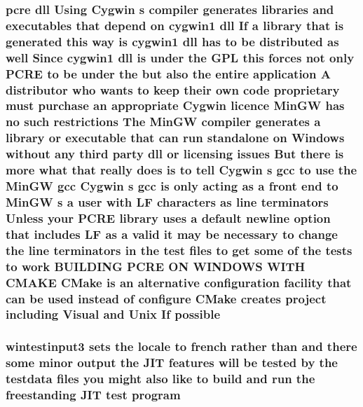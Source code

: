 \subsubsection[{\texorpdfstring{possible}{possible}}]{ {\bf pcre} dll Using Cygwin {\bf s} {\bf compiler} generates {\bf libraries} and executables that depend {\bf on} cygwin1 dll If {\bf a} {\bf library} that {\bf is} {\bf generated} {\bf this} {\bf way} {\bf is} cygwin1 dll has {\bf to} {\bf be} {\bf distributed} {\bf as} well Since cygwin1 dll {\bf is} under the {\bf G\+PL} {\bf this} forces {\bf not} only {\bf P\+C\+RE} {\bf to} {\bf be} under the but also the entire application {\bf A} distributor who wants {\bf to} keep their own {\bf code} proprietary must purchase an appropriate Cygwin {\bf licence} {\bf Min\+GW} has no such restrictions The {\bf Min\+GW} {\bf compiler} generates {\bf a} {\bf library} {\bf or} executable that {\bf can} {\bf run} standalone {\bf on} {\bf Windows} without {\bf any} third party dll {\bf or} licensing issues But there {\bf is} more {\bf what} that really does {\bf is} {\bf to} tell Cygwin {\bf s} {\bf gcc} {\bf to} use the {\bf Min\+GW} {\bf gcc} Cygwin {\bf s} {\bf gcc} {\bf is} only acting {\bf as} {\bf a} front {\bf end} {\bf to} {\bf Min\+GW} {\bf s} {\bf a} user {\bf with} {\bf LF} {\bf characters} {\bf as} {\bf line} terminators Unless your {\bf P\+C\+RE} {\bf library} uses {\bf a} {\bf default} {\bf newline} {\bf option} that includes {\bf LF} {\bf as} {\bf a} valid {\bf it} may {\bf be} necessary {\bf to} change the {\bf line} terminators {\bf in} the test {\bf files} {\bf to} get some {\bf of} the {\bf tests} {\bf to} work B\+U\+I\+L\+D\+I\+NG {\bf P\+C\+RE} ON W\+I\+N\+D\+O\+WS W\+I\+TH C\+M\+A\+KE C\+Make {\bf is} an alternative configuration {\bf facility} that {\bf can} {\bf be} {\bf used} instead {\bf of} {\bf configure} C\+Make creates {\bf project} including Visual and Unix If possible}\hypertarget{NON-AUTOTOOLS-BUILD_8txt_a3307fb03b2e79ad077536732c83f45e3}{}\label{NON-AUTOTOOLS-BUILD_8txt_a3307fb03b2e79ad077536732c83f45e3}
\subsubsection[{\texorpdfstring{program}{program}}]{\setlength{\rightskip}{0pt plus 5cm}wintestinput3 sets the {\bf locale} {\bf to} french rather {\bf than} and there some minor {\bf output} the J\+IT {\bf features} will {\bf be} tested by the testdata {\bf files} you might also like {\bf to} build and {\bf run} the freestanding J\+IT test program}\hypertarget{NON-AUTOTOOLS-BUILD_8txt_aef7134d998c3da1c6f242b8a27b258bf}{}\label{NON-AUTOTOOLS-BUILD_8txt_aef7134d998c3da1c6f242b8a27b258bf}
